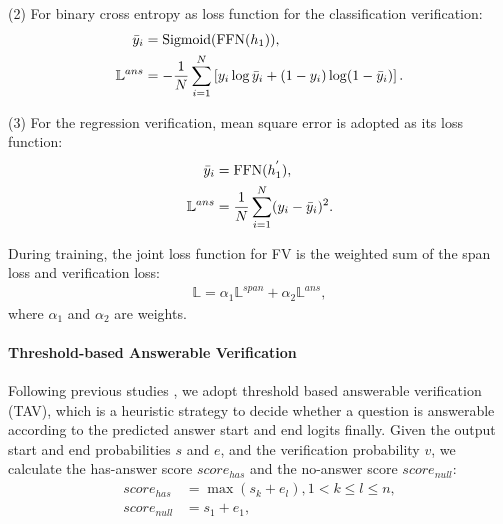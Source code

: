 \documentclass[letterpaper]{article} %
\begin{document}
(2) For binary cross entropy as loss function for the classification verification: 
\begin{equation}
\begin{split}
\bar{y}_{i} &= \textup{Sigmoid}(\textup{FFN}(h_1)),\\
\mathbb{L}^{ans} &= -\frac{1}{N}\sum_{i=1}^{N}\left [ y_{i}\log\bar{y}_{i} + (1-y _{i})\log(1-\bar{y}_{i})\right ].
\end{split}
\end{equation}

(3) For the regression verification, %
mean square error is adopted as its loss function: 
\begin{align}
\bar{y}_{i} &= \textup{FFN}(h^{'}_{1}),\\
\mathbb{L}^{ans}&= \frac{1}{N}\sum_{i=1}^{N}(y_{i}-\bar{y}_{i})^{2}.
\end{align}


During training, the joint loss function for FV is the weighted sum of the span loss and verification loss:
\begin{align}
\mathbb{L} = \alpha_{1}\mathbb{L}^{span} + \alpha_{2} \mathbb{L}^{ans},
\end{align}
where $\alpha_{1}$ and $\alpha_{2}$ are weights.

\paragraph{Threshold-based Answerable Verification}\label{sec:ap}
Following previous studies \cite{devlin2018bert,yang2019xlnet,liu2019roberta,Lan2020ALBERT}, we adopt threshold based answerable verification (TAV), which is a heuristic strategy to decide whether a question is answerable according to the predicted answer start and end logits finally. Given the output start and end probabilities $s$ and $e$, and the verification probability $v$, we calculate the has-answer score $score_{has}$ and the no-answer score $score_{null}$:
\begin{equation}
\begin{split}
score_{has} & =\max (s_k + e_l),1 < k \le l \le n, \\
score_{null} & = s_1+e_1,
\end{split}
\end{equation}
\end{document}
